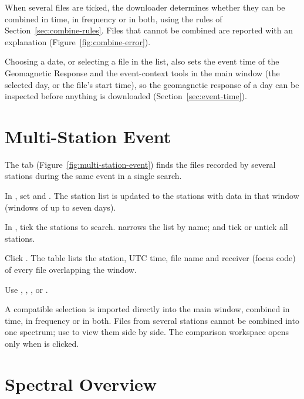 When several files are ticked, the downloader determines whether they can be combined in
time, in frequency or in both, using the rules of Section~\ref{sec:combine-rules}. Files that
cannot be combined are reported with an explanation (Figure~\ref{fig:combine-error}).

Choosing a date, or selecting a file in the list, also sets the event time of the
Geomagnetic Response and the event-context tools in the main window (the selected day, or the
file's start time), so the geomagnetic response of a day can be inspected before anything is
downloaded (Section~\ref{sec:event-time}).

\section{Multi-Station Event}
\label{sec:multi-station-event}

The  tab (Figure~\ref{fig:multi-station-event}) finds the files
recorded by several stations during the same event in a single search.


\begin{steps}
  \item In , set  and . The station list
    is updated to the stations with data in that window (windows of up to seven days).
  \item In , tick the stations to search.  narrows the
    list by name;  and  tick or untick all stations.
  \item Click . The  table lists the
    station, UTC time, file name and receiver (focus code) of every file overlapping the
    window.
  \item Use , , , 
    or .
\end{steps}

A compatible selection is imported directly into the main window, combined in time, in
frequency or in both. Files from several stations cannot be combined into one spectrum; use
 to view them side by side. The comparison workspace opens only when
 is clicked.

\section{Spectral Overview}
\label{sec:spectral-overview}

